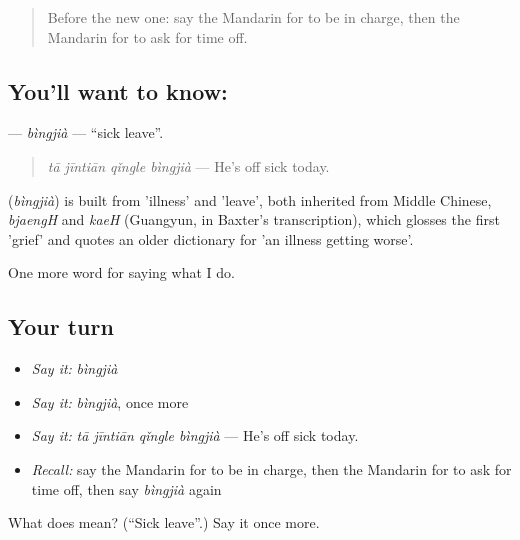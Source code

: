 \label{lesson:ZH-C263-bingjia}



\begin{quote}
Before the new one: say the Mandarin for to be in charge, then the Mandarin for to ask for time off.
\end{quote}

\subsection*{You'll want to know: }
\textbf{} — \emph{bìngjià} — \textquotedblleft{}sick leave\textquotedblright{}.

\begin{quote}
\textbf{} \emph{tā jīntiān qǐngle bìngjià} — He's off sick today.
\end{quote}

\begin{cousinweb}
\textbf{} (\emph{bìngjià}) is built from  'illness' and  'leave', both inherited from Middle Chinese, \emph{bjaengH} and \emph{kaeH} (Guangyun, in Baxter's transcription), which glosses the first 'grief' and quotes an older dictionary for 'an illness getting worse'.
\end{cousinweb}

\begin{grammarlens}[title={What you've built}]
One more word for saying what I do.
\end{grammarlens}

\subsection*{Your turn}
\begin{itemize}
\raggedright
  \item \emph{Say it:} \emph{bìngjià}
  \item \emph{Say it:} \emph{bìngjià}, once more
  \item \emph{Say it:} \emph{tā jīntiān qǐngle bìngjià} — He's off sick today.
  \item \emph{Recall:} say the Mandarin for to be in charge, then the Mandarin for to ask for time off, then say \emph{bìngjià} again
\end{itemize}

\begin{tcolorbox}[breakable,colback=teal!4,colframe=teal!35!black,title={Before you move on}]
What does  mean? (\textquotedblleft{}Sick leave\textquotedblright{}.) Say it once more.
\end{tcolorbox}
